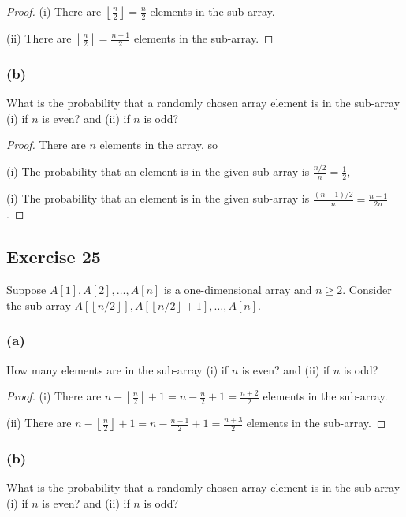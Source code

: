 \documentclass[14pt]{extarticle}
\newcommand{\floor}[1]{{\left\lfloor#1\right\rfloor}}
\begin{document}
\begin{proof}
(i) There are \(\floor{\frac{n}{2}} = \frac{n}{2}\) elements in the sub-array.

(ii) There are \(\floor{\frac{n}{2}} = \frac{n-1}{2}\) elements in the sub-array.
\end{proof}

\subsubsection{(b)}
What is the probability that a randomly chosen array element is in the sub-array (i) if $n$ is even? and 
(ii) if $n$ is odd?

\begin{proof}
There are $n$ elements in the array, so

(i) The probability that an element is in the given sub-array is \(\frac{n/2}{n} = \frac{1}{2}\),

(i) The probability that an element is in the given sub-array is \(\frac{(n-1)/2}{n} = \frac{n-1}{2n}\).
\end{proof}

\subsection{Exercise 25}
Suppose \(A[1], A[2], \ldots, A[n]\) is a one-dimensional array and \(n \geq 2\). Consider the sub-array 
\(A[\floor{n/2}], A[\floor{n/2}+1], \ldots, A[n]\).

\subsubsection{(a)}
How many elements are in the sub-array (i) if $n$ is even? and (ii) if $n$ is odd?

\begin{proof}
(i) There are \(n - \floor{\frac{n}{2}} + 1 = n - \frac{n}{2} + 1 = \frac{n+2}{2}\) elements in the sub-array.

(ii) There are \(n-\floor{\frac{n}{2}}+1 = n-\frac{n-1}{2} + 1 = \frac{n+3}{2}\) elements in the sub-array.
\end{proof}

\subsubsection{(b)}
What is the probability that a randomly chosen array element is in the sub-array (i) if $n$ is even? and 
(ii) if $n$ is odd?
\end{document}
